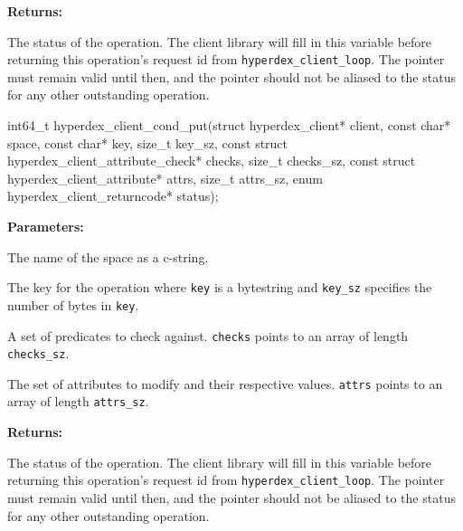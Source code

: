 \noindent\textbf{Returns:}
\begin{description}[labelindent=\widthof{{\texttt{status}}},leftmargin=*,noitemsep,nolistsep,align=right]
\item[\texttt{status}] The status of the operation.  The client library will fill in this variable before returning this operation's request id from \texttt{hyperdex\_client\_loop}.  The pointer must remain valid until then, and the pointer should not be aliased to the status for any other outstanding operation.
\end{description}

\funcsep
\begin{ccode}
int64_t hyperdex_client_cond_put(struct hyperdex_client* client,
                const char* space,
                const char* key, size_t key_sz,
                const struct hyperdex_client_attribute_check* checks, size_t checks_sz,
                const struct hyperdex_client_attribute* attrs, size_t attrs_sz,
                enum hyperdex_client_returncode* status);
\end{ccode}
\funcdesc 

\noindent\textbf{Parameters:}
\begin{description}[labelindent=\widthof{{\texttt{checks}, \texttt{checks\_sz}}},leftmargin=*,noitemsep,nolistsep,align=right]
\item[\texttt{space}] The name of the space as a c-string.
\item[\texttt{key}, \texttt{key\_sz}] The key for the operation where \texttt{key} is a bytestring and \texttt{key\_sz} specifies the number of bytes in \texttt{key}.
\item[\texttt{checks}, \texttt{checks\_sz}] A set of predicates to check against.  \texttt{checks} points to an array of length \texttt{checks\_sz}.
\item[\texttt{attrs}, \texttt{attrs\_sz}] The set of attributes to modify and their respective values.  \texttt{attrs} points to an array of length \texttt{attrs\_sz}.
\end{description}

\noindent\textbf{Returns:}
\begin{description}[labelindent=\widthof{{\texttt{status}}},leftmargin=*,noitemsep,nolistsep,align=right]
\item[\texttt{status}] The status of the operation.  The client library will fill in this variable before returning this operation's request id from \texttt{hyperdex\_client\_loop}.  The pointer must remain valid until then, and the pointer should not be aliased to the status for any other outstanding operation.
\end{description}

